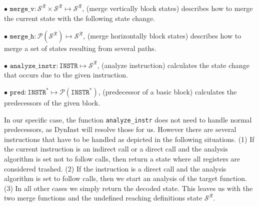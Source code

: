 $\bullet$ $\texttt{merge\_v} : \mathcal{S}^\mathcal{R} \times \mathcal{S}^\mathcal{R} \mapsto \mathcal{S}^\mathcal{R}$, (merge vertically block states) describes how to merge the current state with the following state change.

$\bullet$ $\texttt{merge\_h} : \mathcal{P}(\mathcal{S}^\mathcal{R}) \mapsto \mathcal{S}^\mathcal{R}$, (merge horizontally block states) describes how to merge a set of states resulting from several paths.

$\bullet$ $\texttt{analyze\_instr} : \texttt{INSTR} \mapsto \mathcal{S}^\mathcal{R}$, (analyze instruction) calculates the state change that occurs due to the given instruction.

$\bullet$ $\texttt{pred} : \texttt{INSTR}^* \mapsto \mathcal{P}(\texttt{INSTR}^*)$, (predecessor of a basic block) calculates the predecessors of the given block.

In our specific case, the function \texttt{analyze\_instr} does not need to handle normal predecessors, as DynInst will resolve those for us. 
However there are several instructions that have to be handled as depicted in the following situations. 
(1) If the current instruction is an indirect call or a direct call and the analysis algorithm is set not to follow calls, then return a state where all registers are considered trashed. 
(2) If the instruction is a direct call and the analysis algorithm is set to follow calls, then we start an analysis of the target function. 
(3) In all other cases we simply return the decoded state. This leaves us with the two merge functions and the undefined reaching definitions state $\mathcal{S}^\mathcal{R}$. 


